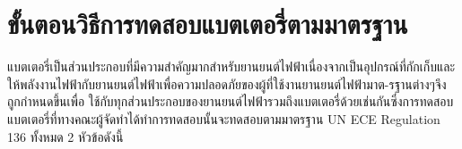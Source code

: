 \chapter{ขั้นตอนวิธีการทดสอบแบตเตอรี่ตามมาตรฐาน}
แบตเตอรี่เป็นส่วนประกอบที่มีความสำคัญมากสำหรับยานยนต์ไฟฟ้าเนื่องจากเป็นอุปกรณ์ที่กักเก็บและให้พลังงานไฟฟ้ากับยานยนต์ไฟฟ้าเพื่อความปลอดภัยของผู้ที่ใช้งานยานยนต์ไฟฟ้ามาต-รฐานต่างๆจึงถูกกำหนดขึ้นเพื่อ
ใช้กับทุกส่วนประกอบของยานยนต์ไฟฟ้ารวมถึงแบตเตอรี่ด้วยเช่นกันซึ่งการทดสอบแบตเตอรี่ที่ทางคณะผู้จัดทำได้ทำการทดสอบนั้นจะทดสอบตามมาตรฐาน UN ECE Regulation 136 ทั้งหมด 2 หัวข้อดังนี้

